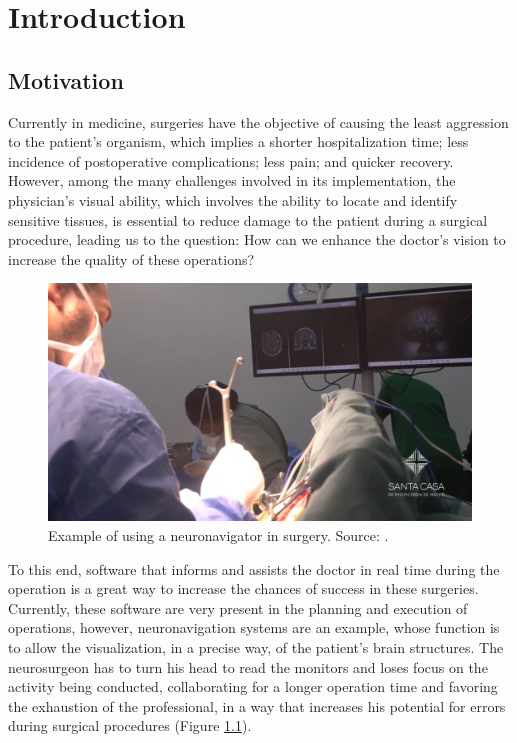 \chapter{Introduction}\label{chp:resultadosEsparados}

\section{Motivation}

Currently in medicine, surgeries have the objective of causing the least aggression to the patient's organism, which implies a shorter hospitalization time; less incidence of postoperative complications; less pain; and quicker recovery. However, among the many challenges involved in its implementation, the physician's visual ability, which involves the ability to locate and identify sensitive tissues, is essential to reduce damage to the patient during a surgical procedure, leading us to the question: How can we enhance the doctor's vision to increase the quality of these operations?

\begin{figure}[h]
    \centering
    \includegraphics[width=.55\linewidth]{figuras/enunciado.png}
    \caption{Example of using a neuronavigator in surgery. Source: \cite{santacasa}.}
    \label{fig:enunciado}
\end{figure}

To this end, software that informs and assists the doctor in real time during the operation is a great way to increase the chances of success in these surgeries. Currently, these software are very present in the planning and execution of operations, however, neuronavigation systems are an example, whose function is to allow the visualization, in a precise way, of the patient's brain structures. The neurosurgeon has to turn his head to read the monitors and loses focus on the activity being conducted, collaborating for a longer operation time and favoring the exhaustion of the professional, in a way that increases his potential for errors during surgical procedures (Figure \ref{fig:enunciado}).

